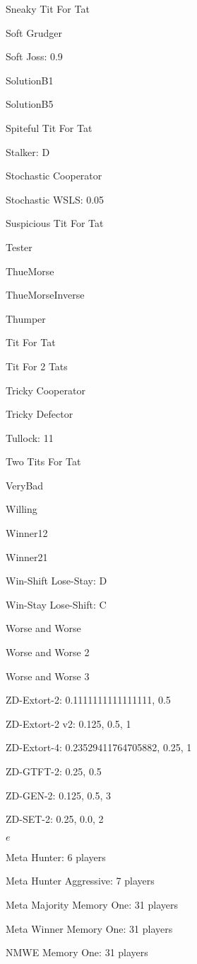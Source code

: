 \item Sneaky Tit For Tat
\item Soft Grudger
\item Soft Joss: 0.9
\item SolutionB1
\item SolutionB5
\item Spiteful Tit For Tat
\item Stalker: D
\item Stochastic Cooperator
\item Stochastic WSLS: 0.05
\item Suspicious Tit For Tat
\item Tester
\item ThueMorse
\item ThueMorseInverse
\item Thumper
\item Tit For Tat
\item Tit For 2 Tats
\item Tricky Cooperator
\item Tricky Defector
\item Tullock: 11
\item Two Tits For Tat
\item VeryBad
\item Willing
\item Winner12
\item Winner21
\item Win-Shift Lose-Stay: D
\item Win-Stay Lose-Shift: C
\item Worse and Worse
\item Worse and Worse 2
\item Worse and Worse 3
\item ZD-Extort-2: 0.1111111111111111, 0.5
\item ZD-Extort-2 v2: 0.125, 0.5, 1
\item ZD-Extort-4: 0.23529411764705882, 0.25, 1
\item ZD-GTFT-2: 0.25, 0.5
\item ZD-GEN-2: 0.125, 0.5, 3
\item ZD-SET-2: 0.25, 0.0, 2
\item $e$
\item Meta Hunter: 6 players
\item Meta Hunter Aggressive: 7 players
\item Meta Majority Memory One: 31 players
\item Meta Winner Memory One: 31 players
\item NMWE Memory One: 31 players
